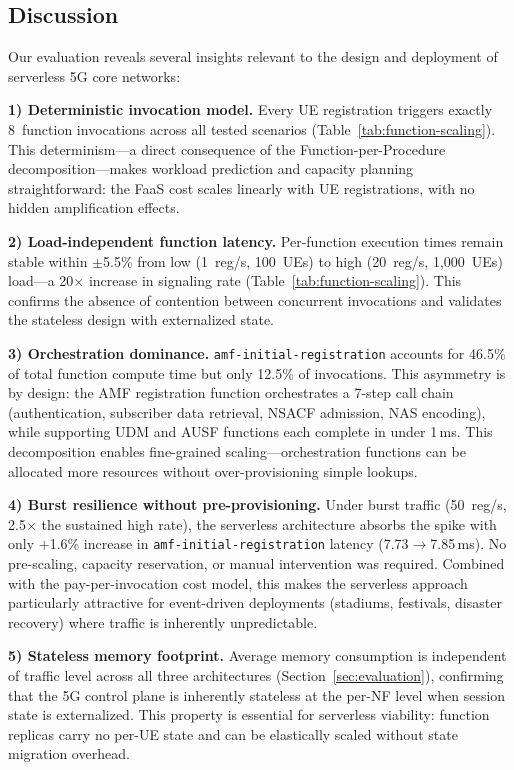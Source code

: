 \documentclass[conference]{IEEEtran}
\begin{document}
\subsection{Discussion}
\label{sec:discussion}

Our evaluation reveals several insights relevant to the design and deployment of serverless 5G core networks:

\textbf{1) Deterministic invocation model.} Every UE registration triggers exactly 8~function invocations across all tested scenarios (Table~\ref{tab:function-scaling}). This determinism---a direct consequence of the Function-per-Procedure decomposition---makes workload prediction and capacity planning straightforward: the FaaS cost scales linearly with UE registrations, with no hidden amplification effects.

\textbf{2) Load-independent function latency.} Per-function execution times remain stable within $\pm$5.5\% from low (1~reg/s, 100~UEs) to high (20~reg/s, 1{,}000~UEs) load---a 20$\times$ increase in signaling rate (Table~\ref{tab:function-scaling}). This confirms the absence of contention between concurrent invocations and validates the stateless design with externalized state.

\textbf{3) Orchestration dominance.} \texttt{amf-initial-registration} accounts for 46.5\% of total function compute time but only 12.5\% of invocations. This asymmetry is by design: the AMF registration function orchestrates a 7-step call chain (authentication, subscriber data retrieval, NSACF admission, NAS encoding), while supporting UDM and AUSF functions each complete in under 1\,ms. This decomposition enables fine-grained scaling---orchestration functions can be allocated more resources without over-provisioning simple lookups.

\textbf{4) Burst resilience without pre-provisioning.} Under burst traffic (50~reg/s, 2.5$\times$ the sustained high rate), the serverless architecture absorbs the spike with only $+$1.6\% increase in \texttt{amf-initial-registration} latency (7.73$\to$7.85\,ms). No pre-scaling, capacity reservation, or manual intervention was required. Combined with the pay-per-invocation cost model, this makes the serverless approach particularly attractive for event-driven deployments (stadiums, festivals, disaster recovery) where traffic is inherently unpredictable.

\textbf{5) Stateless memory footprint.} Average memory consumption is independent of traffic level across all three architectures (Section~\ref{sec:evaluation}), confirming that the 5G control plane is inherently stateless at the per-NF level when session state is externalized. This property is essential for serverless viability: function replicas carry no per-UE state and can be elastically scaled without state migration overhead.
\end{document}
